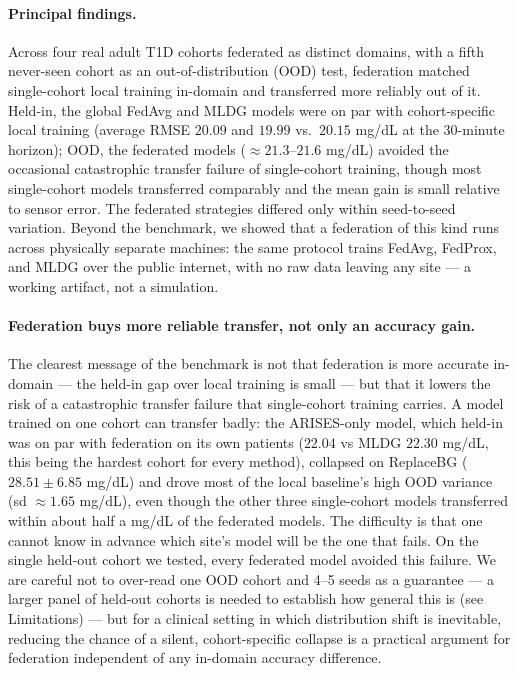 \documentclass[10pt,letterpaper]{article}
\begin{document}
\paragraph{Principal findings.} Across four real adult T1D cohorts federated as
distinct domains, with a fifth never-seen cohort as an out-of-distribution (OOD)
test, federation matched single-cohort local training in-domain and transferred
more reliably out of it. Held-in, the global FedAvg and MLDG models were on par
with cohort-specific local training (average RMSE $20.09$ and $19.99$ vs.\
$20.15$ mg/dL at the 30-minute horizon); OOD, the federated models
($\approx 21.3$--$21.6$ mg/dL) avoided the occasional catastrophic transfer
failure of single-cohort training, though most single-cohort models transferred
comparably and the mean gain is small relative to sensor error. The federated
strategies differed only within seed-to-seed variation. Beyond the benchmark, we
showed that a federation of this kind runs across physically separate machines:
the same protocol trains FedAvg, FedProx, and MLDG over the public internet, with
no raw data leaving any site --- a working artifact, not a simulation.

\paragraph{Federation buys more reliable transfer, not only an accuracy gain.}
The clearest message of the benchmark is not that federation is more accurate
in-domain --- the held-in gap over local training is small --- but that it
lowers the risk of a catastrophic transfer failure that single-cohort training
carries. A model trained on one cohort can transfer badly: the ARISES-only
model, which held-in was on par with federation on its own patients ($22.04$ vs
MLDG $22.30$ mg/dL, this being the hardest cohort for every method), collapsed on
ReplaceBG ($28.51 \pm 6.85$ mg/dL) and drove most of the local baseline's high
OOD variance
(sd $\approx 1.65$ mg/dL), even though the other three single-cohort models
transferred within about half a mg/dL of the federated models. The difficulty is
that one cannot know in advance which site's model will be the one that fails. On
the single held-out cohort we tested, every federated model avoided this failure.
We are careful not to over-read one OOD cohort and 4--5 seeds as a guarantee ---
a larger panel of held-out cohorts is needed to establish how general this is
(see Limitations) --- but for a clinical setting in which distribution shift is
inevitable, reducing the chance of a silent, cohort-specific collapse is a
practical argument for federation independent of any in-domain accuracy
difference.
\end{document}

